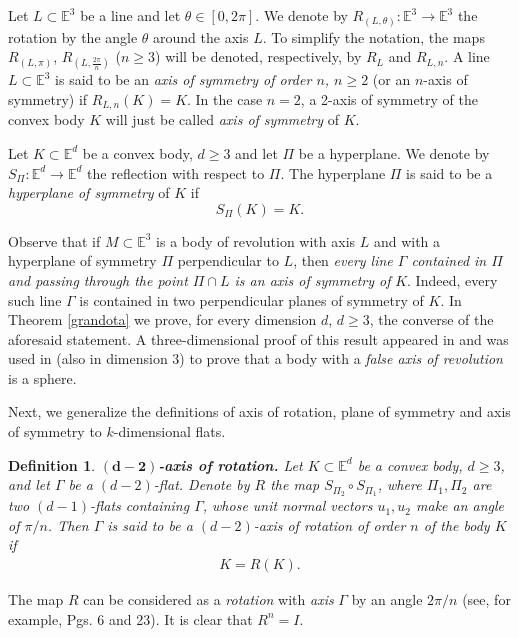 \documentclass[12pt,thmsa]{amsart}
\newcommand{\Et}{\mathbb{E}^3}
\newcommand{\Ed}{\mathbb{E}^{d}}
\newtheorem{definition}{Definition}
\begin{document}
Let $L\subset \Et$ be a  line and let $\theta \in [0,2\pi]$.  We denote by $R_{(L,\theta)}:\Et \rightarrow \Et$ the rotation by the angle $\theta$ around the axis $L$. To simplify the notation, the maps $R_{(L,\pi)}$, $R_{(L,\frac{2\pi}{n})}$ ($n \geq 3$) will be denoted, respectively, by  $R_L$ and $R_{L,n}$. A line $L\subset \Et$ is said to be an {\it axis of symmetry of order $n$, $n \geq 2$} (or an $n$-axis of symmetry)  if $R_{L, n}(K)=K$. In the case $n=2$, a 2-axis of symmetry of the convex body $K$ will just be called \textit{axis of symmetry} of $K$. %



Let $K \subset \Ed$ be a convex body, $d\geq 3$ and let $\Pi$ be a  hyperplane. We denote by $S_{\Pi}: \Ed \rightarrow \Ed$ the reflection with respect to $\Pi$. The hyperplane $\Pi$ is said to be a \textit{hyperplane of symmetry} of $K$ if 
\[S_{\Pi}(K)=K.
\]


Observe that if $M\subset \Et$ is a body of revolution with axis $L$ and with a hyperplane of symmetry $\Pi$ perpendicular to $L$, then \textit{every line $\Gamma$ contained in $\Pi$ and passing through the point $\Pi \cap L$ is an axis of symmetry of} $K$. Indeed, every such line $\Gamma$ is contained in two perpendicular planes of symmetry of $K$. In Theorem \ref{grandota} we prove, for every dimension $d$, $d\geq 3$, the converse of the aforesaid statement. A three-dimensional proof of this result appeared in \cite[Thm 7]{ACJM} and was used in \cite{jemomo} (also in dimension 3) to prove that a body with a \textit{false axis of revolution} is a sphere. 






 


Next, we generalize the definitions of axis of rotation, plane of symmetry and axis of symmetry to $k$-dimensional flats. 

\begin{definition}\label{d2ax}\textbf{ $\mathbf{(d-2)}$-axis of rotation.}
Let $K \subset \Ed$ be a convex body, $d\geq 3$, and let $\Gamma$ be a $(d-2)$-flat. 
Denote by $R$ the map $S_{\Pi_2}\circ S_{\Pi_1}$, where $\Pi_1,\Pi_2$ are two $(d-1)$-flats containing $\Gamma$, whose unit normal vectors $u_1,u_2$ make an angle of $\pi/n$. Then $\Gamma$ is said to be a $(d-2)$-\textit{axis of rotation of order $n$} of the body $K$ if 
\begin{eqnarray}\label{cigala}
K= R(K).
\end{eqnarray}
\end{definition}
The map $R$ can be considered as a \textit{rotation} with \textit{axis} $\Gamma$ by an angle $2\pi/n$ (see, for example, \cite{conway} Pgs. 6 and 23). It is clear that $R^n=I$.
\end{document}

